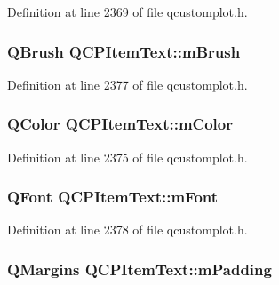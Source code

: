 Definition at line 2369 of file qcustomplot.\-h.

\hypertarget{class_q_c_p_item_text_a2535911875faa459b8337f2efccb5cb8}{
\subsubsection[{m\-Brush}]{\setlength{\rightskip}{0pt plus 5cm}Q\-Brush Q\-C\-P\-Item\-Text\-::m\-Brush\hspace{0.3cm}{\ttfamily [protected]}}}\label{class_q_c_p_item_text_a2535911875faa459b8337f2efccb5cb8}


Definition at line 2377 of file qcustomplot.\-h.

\hypertarget{class_q_c_p_item_text_a8407f284ad867f627878cc26ef433d08}{
\subsubsection[{m\-Color}]{\setlength{\rightskip}{0pt plus 5cm}Q\-Color Q\-C\-P\-Item\-Text\-::m\-Color\hspace{0.3cm}{\ttfamily [protected]}}}\label{class_q_c_p_item_text_a8407f284ad867f627878cc26ef433d08}


Definition at line 2375 of file qcustomplot.\-h.

\hypertarget{class_q_c_p_item_text_a1dc87fe2a824820d549ffd7e644eef8d}{
\subsubsection[{m\-Font}]{\setlength{\rightskip}{0pt plus 5cm}Q\-Font Q\-C\-P\-Item\-Text\-::m\-Font\hspace{0.3cm}{\ttfamily [protected]}}}\label{class_q_c_p_item_text_a1dc87fe2a824820d549ffd7e644eef8d}


Definition at line 2378 of file qcustomplot.\-h.

\hypertarget{class_q_c_p_item_text_ae7b3ef0ce6046efd4b346d28f2e1fb67}{
\subsubsection[{m\-Padding}]{\setlength{\rightskip}{0pt plus 5cm}Q\-Margins Q\-C\-P\-Item\-Text\-::m\-Padding\hspace{0.3cm}{\ttfamily [protected]}}}\label{class_q_c_p_item_text_ae7b3ef0ce6046efd4b346d28f2e1fb67}


